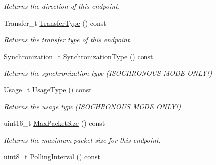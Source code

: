 \begin{DoxyCompactItemize}
\begin{DoxyCompactList}\small\item\em Returns the direction of this endpoint. \end{DoxyCompactList}\item 
\hypertarget{class_lib_u_s_b_1_1_endpoint_impl_ab71b39c0f12a403f00898fb98512199e}{Transfer\-\_\-t \hyperlink{class_lib_u_s_b_1_1_endpoint_impl_ab71b39c0f12a403f00898fb98512199e}{Transfer\-Type} () const }\label{class_lib_u_s_b_1_1_endpoint_impl_ab71b39c0f12a403f00898fb98512199e}

\begin{DoxyCompactList}\small\item\em Returns the transfer type of this endpoint. \end{DoxyCompactList}\item 
\hypertarget{class_lib_u_s_b_1_1_endpoint_impl_a234acdd930c6ce6cb55978a2280a6625}{Synchronization\-\_\-t \hyperlink{class_lib_u_s_b_1_1_endpoint_impl_a234acdd930c6ce6cb55978a2280a6625}{Synchronization\-Type} () const }\label{class_lib_u_s_b_1_1_endpoint_impl_a234acdd930c6ce6cb55978a2280a6625}

\begin{DoxyCompactList}\small\item\em Returns the synchronization type (I\-S\-O\-C\-H\-R\-O\-N\-O\-U\-S M\-O\-D\-E O\-N\-L\-Y!) \end{DoxyCompactList}\item 
\hypertarget{class_lib_u_s_b_1_1_endpoint_impl_ab8a9aefa32a1264f36e840f1ed4f17e5}{Usage\-\_\-t \hyperlink{class_lib_u_s_b_1_1_endpoint_impl_ab8a9aefa32a1264f36e840f1ed4f17e5}{Usage\-Type} () const }\label{class_lib_u_s_b_1_1_endpoint_impl_ab8a9aefa32a1264f36e840f1ed4f17e5}

\begin{DoxyCompactList}\small\item\em Returns the usage type (I\-S\-O\-C\-H\-R\-O\-N\-O\-U\-S M\-O\-D\-E O\-N\-L\-Y!) \end{DoxyCompactList}\item 
\hypertarget{class_lib_u_s_b_1_1_endpoint_impl_ad3ce80b601903cc88bba8a34b22bdd6b}{uint16\-\_\-t \hyperlink{class_lib_u_s_b_1_1_endpoint_impl_ad3ce80b601903cc88bba8a34b22bdd6b}{Max\-Packet\-Size} () const }\label{class_lib_u_s_b_1_1_endpoint_impl_ad3ce80b601903cc88bba8a34b22bdd6b}

\begin{DoxyCompactList}\small\item\em Returns the maximum packet size for this endpoint. \end{DoxyCompactList}\item 
\hypertarget{class_lib_u_s_b_1_1_endpoint_impl_a0823e7abb3d1204ff6afa49870375c6c}{uint8\-\_\-t \hyperlink{class_lib_u_s_b_1_1_endpoint_impl_a0823e7abb3d1204ff6afa49870375c6c}{Polling\-Interval} () const }\label{class_lib_u_s_b_1_1_endpoint_impl_a0823e7abb3d1204ff6afa49870375c6c}


\end{DoxyCompactItemize}
